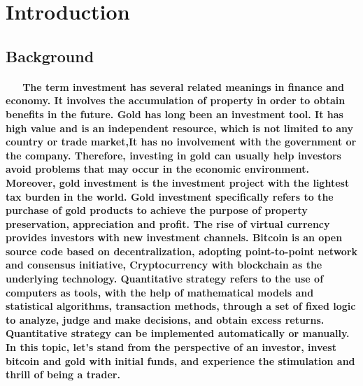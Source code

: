 \documentclass{mcmthesis}
\begin{document}
	\maketitle         %
	\tableofcontents   %
	\newpage
	
	
	\section{Introduction}
	\subsection{Background}
	\paragraph{\ \ \ The term investment has several related meanings in finance and economy. It involves the accumulation of property in order to obtain benefits in the future. Gold has long been an investment tool. It has high value and is an independent resource, which is not limited to any country or trade market,It has no involvement with the government or the company. Therefore, investing in gold can usually help investors avoid problems that may occur in the economic environment. Moreover, gold investment is the investment project with the lightest tax burden in the world. Gold investment specifically refers to the purchase of gold products to achieve the purpose of property preservation, appreciation and profit. The rise of virtual currency provides investors with new investment channels. Bitcoin is an open source code based on decentralization, adopting point-to-point network and consensus initiative,
		Cryptocurrency with blockchain as the underlying technology. Quantitative strategy refers to the use of computers as tools, with the help of mathematical models and statistical algorithms, transaction methods, through a set of fixed logic to analyze, judge and make decisions, and obtain excess returns. Quantitative strategy can be implemented automatically or manually. In this topic, let's stand from the perspective of an investor, invest bitcoin and gold with initial funds, and experience the stimulation and thrill of being a trader.} %
	
\end{document}
